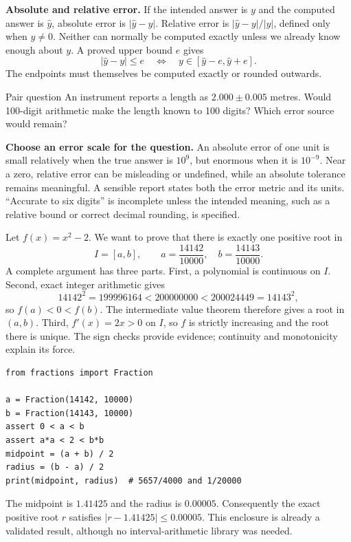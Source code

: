 \textbf{Absolute and relative error.} If the intended answer is $y$ and the computed
answer is $\widehat y$, absolute error is $|\widehat y-y|$. Relative error is
$|\widehat y-y|/|y|$, defined only when $y\ne0$. Neither can normally be computed
exactly unless we already know enough about $y$. A proved upper bound $e$ gives
\[
 |\widehat y-y|\le e\quad\Longleftrightarrow\quad
 y\in[\widehat y-e,\widehat y+e].
\]
The endpoints must themselves be computed exactly or rounded outwards.
\begin{question}{Pair question}
An instrument reports a length as $2.000\pm0.005$ metres. Would 100-digit arithmetic
make the length known to 100 digits? Which error source would remain?
\end{question}

\textbf{Choose an error scale for the question.} An absolute error of one unit
is small relatively when the true answer is $10^9$, but enormous when it is
$10^{-9}$. Near a zero, relative error can be misleading or undefined, while an
absolute tolerance remains meaningful. A sensible report states both the error
metric and its units. ``Accurate to six digits'' is incomplete unless the intended
meaning, such as a relative bound or correct decimal rounding, is specified.

\newpage
{}
Let $f(x)=x^2-2$. We want to prove that there is exactly one positive root in
\[
 I=[a,b],\qquad a=\frac{14142}{10000},\quad b=\frac{14143}{10000}.
\]
A complete argument has three parts. First, a polynomial is continuous on $I$.
Second, exact integer arithmetic gives
\[
 14142^2=199996164<200000000<200024449=14143^2,
\]
so $f(a)<0<f(b)$. The intermediate value theorem therefore gives a root in $(a,b)$.
Third, $f'(x)=2x>0$ on $I$, so $f$ is strictly increasing and the root there is unique.
The sign checks provide evidence; continuity and monotonicity explain its force.

\begin{lstlisting}
from fractions import Fraction

a = Fraction(14142, 10000)
b = Fraction(14143, 10000)
assert 0 < a < b
assert a*a < 2 < b*b
midpoint = (a + b) / 2
radius = (b - a) / 2
print(midpoint, radius)  # 5657/4000 and 1/20000
\end{lstlisting}
The midpoint is $1.41425$ and the radius is $0.00005$. Consequently the exact
positive root $r$ satisfies $|r-1.41425|\le0.00005$. This enclosure is already a
validated result, although no interval-arithmetic library was needed.

